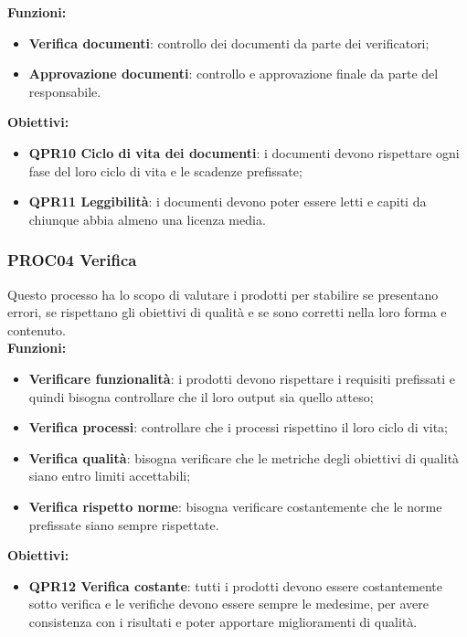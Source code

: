 \documentclass[../piano_di_qualifica.tex]{subfiles}
\begin{document}
\textbf{Funzioni:}
\smallbreak
\begin{itemize}
	\item \textbf{Verifica documenti}: controllo dei documenti da parte dei verificatori;
	\item \textbf{Approvazione documenti}: controllo e approvazione finale da parte del responsabile.
\end{itemize}

\textbf{Obiettivi:}
\smallbreak
\begin{itemize}
	\item \textbf{QPR10 Ciclo di vita dei documenti}: i documenti devono rispettare ogni fase del loro ciclo di vita e le scadenze prefissate;
	\item \textbf{QPR11 Leggibilità}: i documenti devono poter essere letti e capiti da chiunque abbia almeno una licenza media.
\end{itemize}

\subsubsection{PROC04 Verifica}
Questo processo ha lo scopo di valutare i prodotti per stabilire se presentano errori, se rispettano gli obiettivi di qualità e se sono corretti nella loro forma e contenuto. \\

\textbf{Funzioni:}
\smallbreak
\begin{itemize}
	\item \textbf{Verificare funzionalità}:  i prodotti devono rispettare i requisiti prefissati e quindi bisogna controllare che il loro output sia quello atteso;
	\item \textbf{Verifica processi}:  controllare che i processi rispettino il loro ciclo di vita;
	\item \textbf{Verifica qualità}:  bisogna verificare che le metriche degli obiettivi di qualità siano entro limiti accettabili;
	\item \textbf{Verifica rispetto norme}: bisogna verificare costantemente che le norme prefissate siano sempre rispettate.
\end{itemize}

\textbf{Obiettivi:}
\smallbreak
\begin{itemize}
	\item \textbf{QPR12 Verifica costante}: tutti i prodotti devono essere costantemente sotto verifica e le verifiche devono essere sempre le medesime, per avere consistenza con i risultati e poter apportare miglioramenti di qualità.
\end{itemize}
\end{document}
